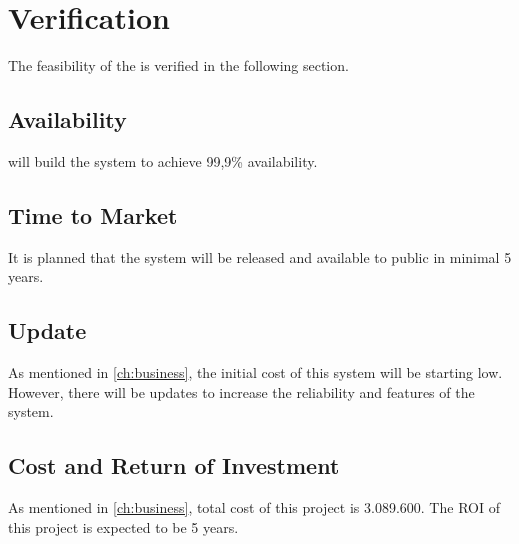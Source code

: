 \section{Verification}
The feasibility of the \ProjectName{} is verified in the following section.

\subsection{Availability}
\CompanyName{} will build the system to achieve 99,9\% availability.

\subsection{Time to Market}
It is planned that the system will be released and available to public in minimal 5 years.

\subsection{Update}
As mentioned in \autoref{ch:business}, the initial cost of this system will be starting low. However, there will be updates to increase the reliability and features of the system. 

\subsection{Cost and Return of Investment}
As mentioned in \autoref{ch:business}, total cost of this project is \EUR{}3.089.600. The ROI of this project is expected to be 5 years.
